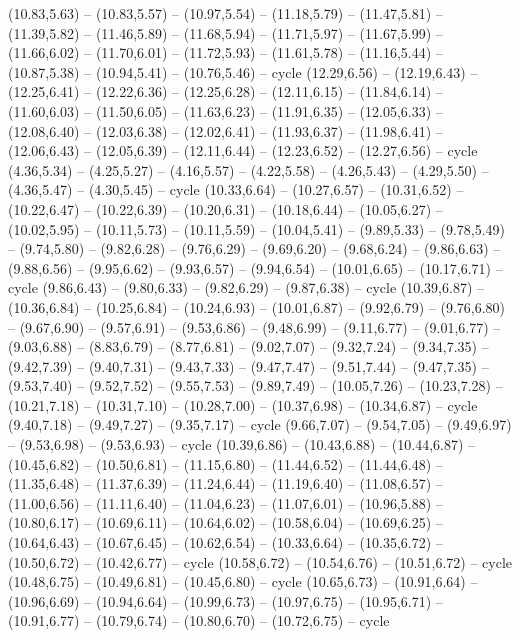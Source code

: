 \expandafter\def\csname geo:see:Erie\endcsname{
  (10.83,5.63) -- (10.83,5.57) -- (10.97,5.54) -- (11.18,5.79) -- (11.47,5.81) -- (11.39,5.82) -- (11.46,5.89) -- (11.68,5.94) -- (11.71,5.97) -- (11.67,5.99) -- (11.66,6.02) -- (11.70,6.01) -- (11.72,5.93) -- (11.61,5.78) -- (11.16,5.44) -- (10.87,5.38) -- (10.94,5.41) -- (10.76,5.46) -- cycle}
\expandafter\def\csname geo:see:Ontario\endcsname{
  (12.29,6.56) -- (12.19,6.43) -- (12.25,6.41) -- (12.22,6.36) -- (12.25,6.28) -- (12.11,6.15) -- (11.84,6.14) -- (11.60,6.03) -- (11.50,6.05) -- (11.63,6.23) -- (11.91,6.35) -- (12.05,6.33) -- (12.08,6.40) -- (12.03,6.38) -- (12.02,6.41) -- (11.93,6.37) -- (11.98,6.41) -- (12.06,6.43) -- (12.05,6.39) -- (12.11,6.44) -- (12.23,6.52) -- (12.27,6.56) -- cycle}
\expandafter\def\csname geo:see:GreatSaltLake\endcsname{
  (4.36,5.34) -- (4.25,5.27) -- (4.16,5.57) -- (4.22,5.58) -- (4.26,5.43) -- (4.29,5.50) -- (4.36,5.47) -- (4.30,5.45) -- cycle}
\expandafter\def\csname geo:see:Michigan\endcsname{
  (10.33,6.64) -- (10.27,6.57) -- (10.31,6.52) -- (10.22,6.47) -- (10.22,6.39) -- (10.20,6.31) -- (10.18,6.44) -- (10.05,6.27) -- (10.02,5.95) -- (10.11,5.73) -- (10.11,5.59) -- (10.04,5.41) -- (9.89,5.33) -- (9.78,5.49) -- (9.74,5.80) -- (9.82,6.28) -- (9.76,6.29) -- (9.69,6.20) -- (9.68,6.24) -- (9.86,6.63) -- (9.88,6.56) -- (9.95,6.62) -- (9.93,6.57) -- (9.94,6.54) -- (10.01,6.65) -- (10.17,6.71) -- cycle
  (9.86,6.43) -- (9.80,6.33) -- (9.82,6.29) -- (9.87,6.38) -- cycle}
\expandafter\def\csname geo:see:Superior\endcsname{
  (10.39,6.87) -- (10.36,6.84) -- (10.25,6.84) -- (10.24,6.93) -- (10.01,6.87) -- (9.92,6.79) -- (9.76,6.80) -- (9.67,6.90) -- (9.57,6.91) -- (9.53,6.86) -- (9.48,6.99) -- (9.11,6.77) -- (9.01,6.77) -- (9.03,6.88) -- (8.83,6.79) -- (8.77,6.81) -- (9.02,7.07) -- (9.32,7.24) -- (9.34,7.35) -- (9.42,7.39) -- (9.40,7.31) -- (9.43,7.33) -- (9.47,7.47) -- (9.51,7.44) -- (9.47,7.35) -- (9.53,7.40) -- (9.52,7.52) -- (9.55,7.53) -- (9.89,7.49) -- (10.05,7.26) -- (10.23,7.28) -- (10.21,7.18) -- (10.31,7.10) -- (10.28,7.00) -- (10.37,6.98) -- (10.34,6.87) -- cycle
  (9.40,7.18) -- (9.49,7.27) -- (9.35,7.17) -- cycle
  (9.66,7.07) -- (9.54,7.05) -- (9.49,6.97) -- (9.53,6.98) -- (9.53,6.93) -- cycle}
\expandafter\def\csname geo:see:Huron\endcsname{
  (10.39,6.86) -- (10.43,6.88) -- (10.44,6.87) -- (10.45,6.82) -- (10.50,6.81) -- (11.15,6.80) -- (11.44,6.52) -- (11.44,6.48) -- (11.35,6.48) -- (11.37,6.39) -- (11.24,6.44) -- (11.19,6.40) -- (11.08,6.57) -- (11.00,6.56) -- (11.11,6.40) -- (11.04,6.23) -- (11.07,6.01) -- (10.96,5.88) -- (10.80,6.17) -- (10.69,6.11) -- (10.64,6.02) -- (10.58,6.04) -- (10.69,6.25) -- (10.64,6.43) -- (10.67,6.45) -- (10.62,6.54) -- (10.33,6.64) -- (10.35,6.72) -- (10.50,6.72) -- (10.42,6.77) -- cycle
  (10.58,6.72) -- (10.54,6.76) -- (10.51,6.72) -- cycle
  (10.48,6.75) -- (10.49,6.81) -- (10.45,6.80) -- cycle
  (10.65,6.73) -- (10.91,6.64) -- (10.96,6.69) -- (10.94,6.64) -- (10.99,6.73) -- (10.97,6.75) -- (10.95,6.71) -- (10.91,6.77) -- (10.79,6.74) -- (10.80,6.70) -- (10.72,6.75) -- cycle}

